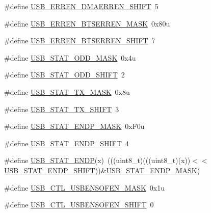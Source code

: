 \begin{DoxyCompactItemize}
\#define \hyperlink{group___u_s_b___register___masks_ga8b75afb2fa004a75b39023e38db4e784}{U\+S\+B\+\_\+\+E\+R\+R\+E\+N\+\_\+\+D\+M\+A\+E\+R\+R\+E\+N\+\_\+\+S\+H\+I\+FT}~5
\item 
\#define \hyperlink{group___u_s_b___register___masks_ga806a809f05df66a7669733c599646f7f}{U\+S\+B\+\_\+\+E\+R\+R\+E\+N\+\_\+\+B\+T\+S\+E\+R\+R\+E\+N\+\_\+\+M\+A\+SK}~0x80u
\item 
\#define \hyperlink{group___u_s_b___register___masks_ga5e760a100c4f43ecfd71952a5f393d77}{U\+S\+B\+\_\+\+E\+R\+R\+E\+N\+\_\+\+B\+T\+S\+E\+R\+R\+E\+N\+\_\+\+S\+H\+I\+FT}~7
\item 
\#define \hyperlink{group___u_s_b___register___masks_ga49caa3c5b36fc89eadadd60cdf331643}{U\+S\+B\+\_\+\+S\+T\+A\+T\+\_\+\+O\+D\+D\+\_\+\+M\+A\+SK}~0x4u
\item 
\#define \hyperlink{group___u_s_b___register___masks_ga15f3e2fa671ea1a59e0b24a9697faf8a}{U\+S\+B\+\_\+\+S\+T\+A\+T\+\_\+\+O\+D\+D\+\_\+\+S\+H\+I\+FT}~2
\item 
\#define \hyperlink{group___u_s_b___register___masks_gab953f904ef3a2b838a922ebdf69cf140}{U\+S\+B\+\_\+\+S\+T\+A\+T\+\_\+\+T\+X\+\_\+\+M\+A\+SK}~0x8u
\item 
\#define \hyperlink{group___u_s_b___register___masks_ga5173e8423017932d90919ddb18f918bd}{U\+S\+B\+\_\+\+S\+T\+A\+T\+\_\+\+T\+X\+\_\+\+S\+H\+I\+FT}~3
\item 
\#define \hyperlink{group___u_s_b___register___masks_gad8a184e838de511e23aa32011fc9f0b6}{U\+S\+B\+\_\+\+S\+T\+A\+T\+\_\+\+E\+N\+D\+P\+\_\+\+M\+A\+SK}~0x\+F0u
\item 
\#define \hyperlink{group___u_s_b___register___masks_ga5d85a4b028002bc9ce0f1650111cd49a}{U\+S\+B\+\_\+\+S\+T\+A\+T\+\_\+\+E\+N\+D\+P\+\_\+\+S\+H\+I\+FT}~4
\item 
\#define \hyperlink{group___u_s_b___register___masks_ga0302fe6637ae59174d7702947430dbba}{U\+S\+B\+\_\+\+S\+T\+A\+T\+\_\+\+E\+N\+DP}(x)~(((uint8\+\_\+t)(((uint8\+\_\+t)(x))$<$$<$\hyperlink{group___u_s_b___register___masks_ga5d85a4b028002bc9ce0f1650111cd49a}{U\+S\+B\+\_\+\+S\+T\+A\+T\+\_\+\+E\+N\+D\+P\+\_\+\+S\+H\+I\+FT}))\&\hyperlink{group___u_s_b___register___masks_gad8a184e838de511e23aa32011fc9f0b6}{U\+S\+B\+\_\+\+S\+T\+A\+T\+\_\+\+E\+N\+D\+P\+\_\+\+M\+A\+SK})
\item 
\#define \hyperlink{group___u_s_b___register___masks_gaa406be72ac0b31143d3a3bc357af334b}{U\+S\+B\+\_\+\+C\+T\+L\+\_\+\+U\+S\+B\+E\+N\+S\+O\+F\+E\+N\+\_\+\+M\+A\+SK}~0x1u
\item 
\#define \hyperlink{group___u_s_b___register___masks_ga674ca18da1675b8ae48c65ca4203da36}{U\+S\+B\+\_\+\+C\+T\+L\+\_\+\+U\+S\+B\+E\+N\+S\+O\+F\+E\+N\+\_\+\+S\+H\+I\+FT}~0
$$
\end{DoxyCompactItemize}

